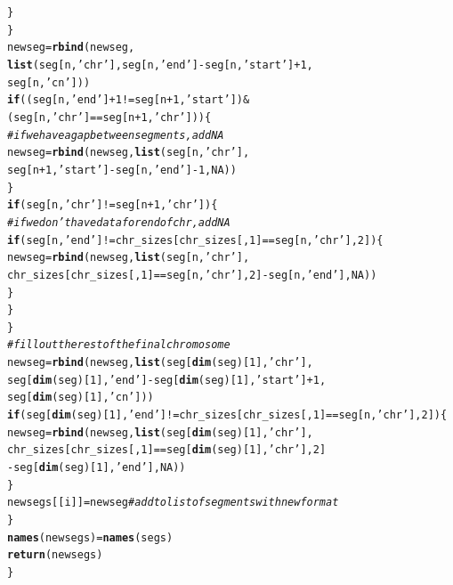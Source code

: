 \documentclass[12pt]{article}\usepackage[]{graphicx}\usepackage[]{color}
\makeatletter
\newcommand{\hlnum}[1]{\textcolor[rgb]{0.686,0.059,0.569}{#1}}%
\newcommand{\hlstr}[1]{\textcolor[rgb]{0.192,0.494,0.8}{#1}}%
\newcommand{\hlcom}[1]{\textcolor[rgb]{0.678,0.584,0.686}{\textit{#1}}}%
\newcommand{\hlopt}[1]{\textcolor[rgb]{0,0,0}{#1}}%
\newcommand{\hlstd}[1]{\textcolor[rgb]{0.345,0.345,0.345}{#1}}%
\newcommand{\hlkwa}[1]{\textcolor[rgb]{0.161,0.373,0.58}{\textbf{#1}}}%
\newcommand{\hlkwb}[1]{\textcolor[rgb]{0.69,0.353,0.396}{#1}}%
\newcommand{\hlkwd}[1]{\textcolor[rgb]{0.737,0.353,0.396}{\textbf{#1}}}%
\newenvironment{kframe}{%
 \def\at@end@of@kframe{}%
 \ifinner\ifhmode%
  \def\at@end@of@kframe{\end{minipage}}%
  \begin{minipage}{\columnwidth}%
 \fi\fi%
 \def\FrameCommand##1{\hskip\@totalleftmargin \hskip-\fboxsep
 \colorbox{shadecolor}{##1}\hskip-\fboxsep
     \hskip-\linewidth \hskip-\@totalleftmargin \hskip\columnwidth}%
 \MakeFramed {\advance\hsize-\width
   \@totalleftmargin\z@ \linewidth\hsize
   \@setminipage}}%
 {\par\unskip\endMakeFramed%
 \at@end@of@kframe}
\newenvironment{knitrout}{}{} %
\makeatother
\begin{document}
\begin{knitrout}
\begin{kframe}
\begin{alltt}
        \hlstd{\}}
      \hlstd{\}}
      \hlstd{newseg} \hlkwb{=} \hlkwd{rbind}\hlstd{(newseg,}
                     \hlkwd{list}\hlstd{(seg[n,}\hlstr{'chr'}\hlstd{], seg[n,}\hlstr{'end'}\hlstd{]} \hlopt{-} \hlstd{seg[n,}\hlstr{'start'}\hlstd{]}\hlopt{+}\hlnum{1}\hlstd{,}
                     \hlstd{seg[n,}\hlstr{'cn'}\hlstd{]))}
      \hlkwa{if} \hlstd{((seg[n,}\hlstr{'end'}\hlstd{]}\hlopt{+}\hlnum{1} \hlopt{!=} \hlstd{seg[n}\hlopt{+}\hlnum{1}\hlstd{,}\hlstr{'start'}\hlstd{])} \hlopt{&}
          \hlstd{(seg[n,} \hlstr{'chr'}\hlstd{]} \hlopt{==} \hlstd{seg[n}\hlopt{+}\hlnum{1}\hlstd{,} \hlstr{'chr'}\hlstd{]))\{}
        \hlcom{#if we have a gap between segments, add NA}
        \hlstd{newseg} \hlkwb{=} \hlkwd{rbind}\hlstd{(newseg,} \hlkwd{list}\hlstd{(seg[n,}\hlstr{'chr'}\hlstd{],}
                        \hlstd{seg[n}\hlopt{+}\hlnum{1}\hlstd{,}\hlstr{'start'}\hlstd{]} \hlopt{-} \hlstd{seg[n,}\hlstr{'end'}\hlstd{]}\hlopt{-}\hlnum{1}\hlstd{,}  \hlnum{NA}\hlstd{))}
      \hlstd{\}}
      \hlkwa{if} \hlstd{(seg[n,} \hlstr{'chr'}\hlstd{]} \hlopt{!=} \hlstd{seg[n}\hlopt{+}\hlnum{1}\hlstd{,} \hlstr{'chr'}\hlstd{])\{}
        \hlcom{#if we don't have data for end of chr, add NA}
        \hlkwa{if} \hlstd{(seg[n,}\hlstr{'end'}\hlstd{]} \hlopt{!=} \hlstd{chr_sizes[chr_sizes[,}\hlnum{1}\hlstd{]} \hlopt{==} \hlstd{seg[n,}\hlstr{'chr'}\hlstd{],}\hlnum{2}\hlstd{])\{}
          \hlstd{newseg} \hlkwb{=} \hlkwd{rbind}\hlstd{(newseg,}\hlkwd{list}\hlstd{(seg[n,}\hlstr{'chr'}\hlstd{],}
                   \hlstd{chr_sizes[chr_sizes[,}\hlnum{1}\hlstd{]} \hlopt{==} \hlstd{seg[n,}\hlstr{'chr'}\hlstd{],}\hlnum{2}\hlstd{]}\hlopt{-}\hlstd{seg[n,}\hlstr{'end'}\hlstd{],}\hlnum{NA}\hlstd{))}
        \hlstd{\}}
      \hlstd{\}}
    \hlstd{\}}
    \hlcom{#fill out the rest of the final chromosome}
    \hlstd{newseg} \hlkwb{=} \hlkwd{rbind}\hlstd{(newseg,} \hlkwd{list}\hlstd{(seg[}\hlkwd{dim}\hlstd{(seg)[}\hlnum{1}\hlstd{],}\hlstr{'chr'}\hlstd{],}
                                \hlstd{seg[}\hlkwd{dim}\hlstd{(seg)[}\hlnum{1}\hlstd{],}\hlstr{'end'}\hlstd{]}\hlopt{-}\hlstd{seg[}\hlkwd{dim}\hlstd{(seg)[}\hlnum{1}\hlstd{],}\hlstr{'start'}\hlstd{]}\hlopt{+}\hlnum{1}\hlstd{,}
                                \hlstd{seg[}\hlkwd{dim}\hlstd{(seg)[}\hlnum{1}\hlstd{],}\hlstr{'cn'}\hlstd{]))}
    \hlkwa{if} \hlstd{(seg[}\hlkwd{dim}\hlstd{(seg)[}\hlnum{1}\hlstd{],}\hlstr{'end'}\hlstd{]} \hlopt{!=} \hlstd{chr_sizes[chr_sizes[,}\hlnum{1}\hlstd{]} \hlopt{==} \hlstd{seg[n,}\hlstr{'chr'}\hlstd{],}\hlnum{2}\hlstd{])\{}
      \hlstd{newseg} \hlkwb{=} \hlkwd{rbind}\hlstd{(newseg,} \hlkwd{list}\hlstd{(seg[}\hlkwd{dim}\hlstd{(seg)[}\hlnum{1}\hlstd{],}\hlstr{'chr'}\hlstd{],}
                                \hlstd{chr_sizes[chr_sizes[,}\hlnum{1}\hlstd{]}\hlopt{==}\hlstd{seg[}\hlkwd{dim}\hlstd{(seg)[}\hlnum{1}\hlstd{],}\hlstr{'chr'}\hlstd{],}\hlnum{2}\hlstd{]}
                                \hlopt{-}\hlstd{seg[}\hlkwd{dim}\hlstd{(seg)[}\hlnum{1}\hlstd{],}\hlstr{'end'}\hlstd{],} \hlnum{NA}\hlstd{))}
    \hlstd{\}}
    \hlstd{newsegs[[i]]} \hlkwb{=} \hlstd{newseg} \hlcom{#add to list of segments with new format}
  \hlstd{\}}
  \hlkwd{names}\hlstd{(newsegs)} \hlkwb{=} \hlkwd{names}\hlstd{(segs)}
  \hlkwd{return}\hlstd{(newsegs)}
\hlstd{\}}


\end{alltt}
\end{kframe}
\end{knitrout}
\end{document}
